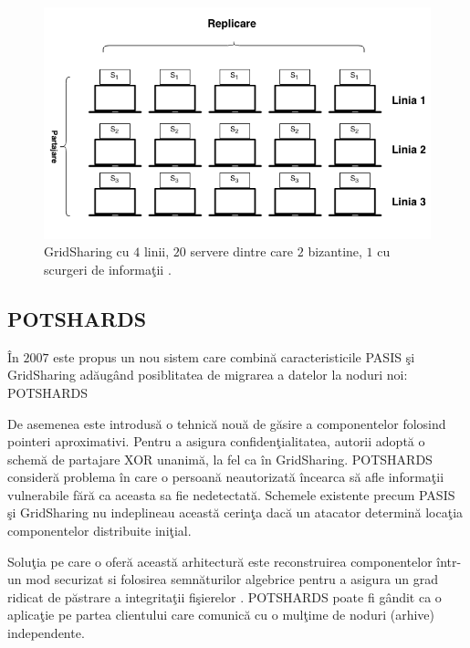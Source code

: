 \documentclass{llncs}
\newcommand{\todo}[1]{{\color{red}{TODO #1}}}
\begin{document}
\begin{figure}[H]
	\includegraphics[width=12cm]{img/GridSharing.png}    %
	\caption{GridSharing cu $4$ linii, $20$ servere dintre care $2$ bizantine, $1$ cu scurgeri de informa\c{t}ii \cite{SB:2005}.}
	\label{fig:grid_sharing}
	\bigskip
\end{figure}


\subsection{POTSHARDS} 
\label{sec:desc_potshards}
\^{I}n $2007$ este propus un nou sistem care combin\u{a} caracteristicile PASIS \c{s}i GridSharing ad\u{a}ug\^{a}nd posiblitatea de migrarea a datelor la noduri noi: POTSHARDS \todo{(Protection Over Time, Securely Harboring
And Reliably Distributing Stuff)) - mereu prima data cand folosesti o abreviere trebuie sa o explici}

\todo{cite! se citeaza la inceput}

De asemenea este introdus\u{a} o tehnic\u{a} nou\u{a} de g\u{a}sire a componentelor folosind pointeri aproximativi. Pentru a asigura confiden\c{t}ialitatea, autorii adopt\u{a} o schem\u{a} de partajare XOR unanim\u{a}, la fel ca \^{i}n GridSharing.
POTSHARDS consider\u{a} problema \^{i}n care o persoan\u{a} neautorizat\u{a} \^{i}ncearca s\u{a} afle informa\c{t}ii vulnerabile f\u{a}r\u{a} ca aceasta sa fie nedetectat\u{a}. Schemele existente precum PASIS \c{s}i GridSharing nu indeplineau aceast\u{a} cerin\c{t}a dac\u{a} un atacator determin\u{a} loca\c{t}ia componentelor distribuite ini\c{t}ial.
\todo{nu inteleg - reformulare, explica ce vrei sa zici!}

Solu\c{t}ia pe care o ofer\u{a} aceast\u{a} arhitectur\u{a} este reconstruirea componentelor \^{i}ntr-un mod securizat si folosirea semn\u{a}turilor algebrice pentru a asigura un grad ridicat de p\u{a}strare a integrita\c{t}ii fi\c{s}ierelor \cite{STM:2006}.
POTSHARDS poate fi g\^{a}ndit ca o aplica\c{t}ie pe partea clientului care comunic\u{a} cu o mul\c{t}ime de noduri (arhive) independente.
\end{document}

